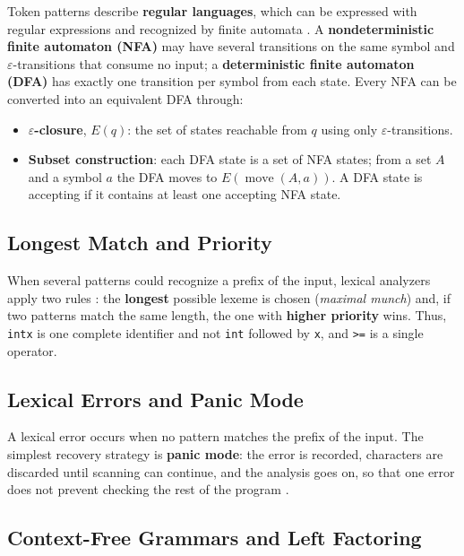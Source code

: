 \documentclass[11pt,letterpaper]{article}
\newcommand{\tok}[1]{\texttt{#1}}
\begin{document}
Token patterns describe \textbf{regular languages}, which can be expressed with
regular expressions and recognized by finite automata \cite{hopcroft2007}. A
\textbf{nondeterministic finite automaton (NFA)} may have several transitions
on the same symbol and $\varepsilon$-transitions that consume no input; a
\textbf{deterministic finite automaton (DFA)} has exactly one transition per
symbol from each state. Every NFA can be converted into an equivalent DFA
through:

\begin{itemize}[nosep]
  \item \textbf{$\varepsilon$-closure}, $E(q)$: the set of states reachable
        from $q$ using only $\varepsilon$-transitions.
  \item \textbf{Subset construction}: each DFA state is a set of NFA states;
        from a set $A$ and a symbol $a$ the DFA moves to
        $E(\operatorname{move}(A,a))$. A DFA state is accepting if it contains
        at least one accepting NFA state.
\end{itemize}

\subsection{Longest Match and Priority}

When several patterns could recognize a prefix of the input, lexical
analyzers apply two rules \cite{aho2006}: the \textbf{longest} possible lexeme
is chosen (\emph{maximal munch}) and, if two patterns match the same length,
the one with \textbf{higher priority} wins. Thus, \tok{intx} is one complete
identifier and not \tok{int} followed by \tok{x}, and \tok{>=} is a single
operator.

\subsection{Lexical Errors and Panic Mode}

A lexical error occurs when no pattern matches the prefix of the input. The
simplest recovery strategy is \textbf{panic mode}: the error is recorded,
characters are discarded until scanning can continue, and the analysis goes
on, so that one error does not prevent checking the rest of the program
\cite{aho2006}.

\subsection{Context-Free Grammars and Left Factoring}
\end{document}
